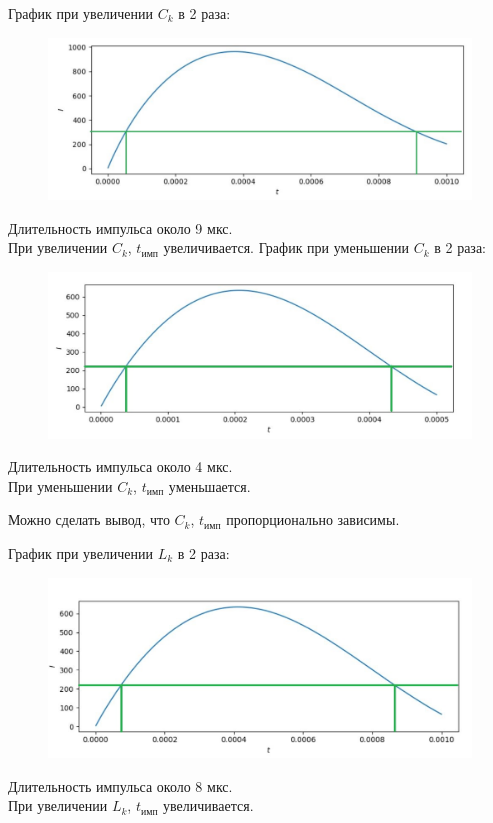 \documentclass[14pt, a4paper]{extarticle}
\begin{document}
\begin{enumerate}
		График при увеличении $C_k$ в 2 раза:
		\begin{figure}[h!]
			\centering
			\includegraphics[scale=0.8]{graphics/graphs43.jpg}
		\end{figure}\par
		Длительность импульса около 9 мкс. \\
		При увеличении $C_k$, $t_{\text{имп}}$ увеличивается.
		\newpage
		График при уменьшении $C_k$ в 2 раза:
		\begin{figure}[h]
			\centering
			\includegraphics[scale=0.8]{graphics/graphs45.jpg}
		\end{figure}\par
		Длительность импульса около 4 мкс. \\
		При уменьшении $C_k$, $t_{\text{имп}}$ уменьшается.\par
		Можно сделать вывод, что $C_k$, $t_{\text{имп}}$ пропорционально зависимы.
		\newpage 
				
		График при увеличении $L_k$ в 2 раза:
		\begin{figure}[h]
			\centering
			\includegraphics[scale=0.8]{graphics/graphs47.jpg}
		\end{figure}\par
		Длительность импульса около 8 мкс.\\
		При увеличении $L_k$, $t_{\text{имп}}$ увеличивается.
		

\end{enumerate}
\end{document}

